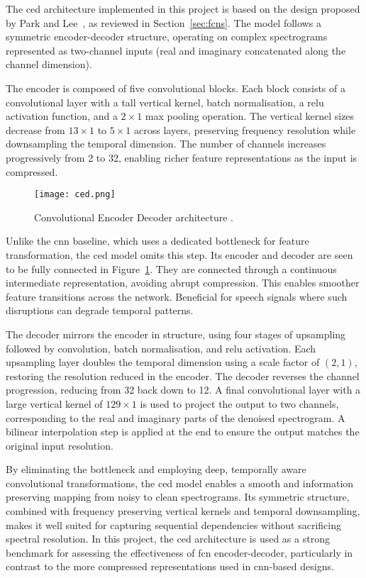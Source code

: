 The \gls{ced} architecture implemented in this project is based on the design proposed by Park and Lee~\cite{park2017acoustic}, as reviewed in Section~\ref{sec:fcns}. The model follows a symmetric encoder-decoder structure, operating on complex spectrograms represented as two-channel inputs (real and imaginary concatenated along the channel dimension).

The encoder is composed of five convolutional blocks. Each block consists of a convolutional layer with a tall vertical kernel, batch normalisation, a \gls{relu} activation function, and a \(2 \times 1\) max pooling operation. The vertical kernel sizes decrease from \(13 \times 1\) to \(5 \times 1\) across layers, preserving frequency resolution while downsampling the temporal dimension. The number of channels increases progressively from 2 to 32, enabling richer feature representations as the input is compressed.

\begin{figure}[h]
    \centering
    \texttt{[image: ced.png]}
    \caption{\label{fig:ced} Convolutional Encoder Decoder architecture \cite{park2017acoustic}.}
\end{figure}

Unlike the \gls{cnn} baseline, which uses a dedicated bottleneck for feature transformation, the \gls{ced} model omits this step. Its encoder and decoder are seen to be fully connected in Figure~\ref{fig:ced}. They are connected through a continuous intermediate representation, avoiding abrupt compression. This enables smoother feature transitions across the network. Beneficial for speech signals where such disruptions can degrade temporal patterns.

The decoder mirrors the encoder in structure, using four stages of upsampling followed by convolution, batch normalisation, and \gls{relu} activation. Each upsampling layer doubles the temporal dimension using a scale factor of \((2, 1)\), restoring the resolution reduced in the encoder. The decoder reverses the channel progression, reducing from 32 back down to 12. A final convolutional layer with a large vertical kernel of \(129 \times 1\) is used to project the output to two channels, corresponding to the real and imaginary parts of the denoised spectrogram. A bilinear interpolation step is applied at the end to ensure the output matches the original input resolution.

By eliminating the bottleneck and employing deep, temporally aware convolutional transformations, the \gls{ced} model enables a smooth and information preserving mapping from noisy to clean spectrograms. Its symmetric structure, combined with frequency preserving vertical kernels and temporal downsampling, makes it well suited for capturing sequential dependencies without sacrificing spectral resolution. In this project, the \gls{ced} architecture is used as a strong benchmark for assessing the effectiveness of \gls{fcn} encoder-decoder, particularly in contrast to the more compressed representations used in \gls{cnn}-based designs.


